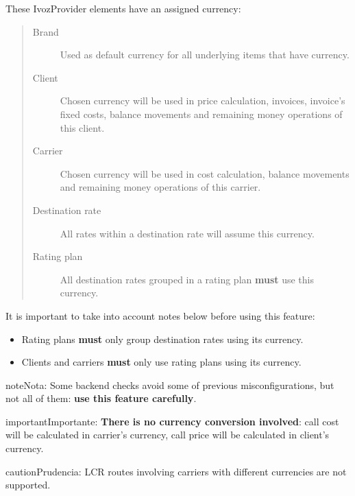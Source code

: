 \documentclass[letterpaper,10pt,spanish]{sphinxmanual}
\begin{document}
These IvozProvider elements have an assigned currency:
\begin{quote}
\begin{description}
\item[{Brand}] \leavevmode
Used as default currency for all underlying items that have currency.

\item[{Client}] \leavevmode
Chosen currency will be used in price calculation, invoices, invoice's fixed costs, balance movements and
remaining money operations of this client.

\item[{Carrier}] \leavevmode
Chosen currency will be used in cost calculation, balance movements and
remaining money operations of this carrier.

\item[{Destination rate}] \leavevmode
All rates within a destination rate will assume this currency.

\item[{Rating plan}] \leavevmode
All destination rates grouped in a rating plan \textbf{must} use this currency.

\end{description}
\end{quote}

It is important to take into account notes below before using this feature:
\begin{itemize}
\item {} 
Rating plans \textbf{must} only group destination rates using its currency.

\item {} 
Clients and carriers \textbf{must} only use rating plans using its currency.

\end{itemize}

\begin{notice}{note}{Nota:}
Some backend checks avoid some of previous misconfigurations, but not all of them: \textbf{use this feature carefully}.
\end{notice}

\begin{notice}{important}{Importante:}
\textbf{There is no currency conversion involved}: call cost will be calculated in carrier's currency, call price
will be calculated in client's currency.
\end{notice}

\begin{notice}{caution}{Prudencia:}
LCR routes involving carriers with different currencies are not supported.
\end{notice}
\label{administration_portal/platform/default_notification_templates:default-notification-templates}
\end{document}
